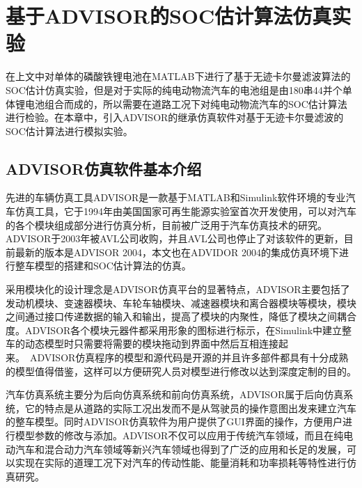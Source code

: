 
\chapter{基于ADVISOR的SOC估计算法仿真实验}
在上文中对单体的磷酸铁锂电池在MATLAB下进行了基于无迹卡尔曼滤波算法的SOC估计仿真实验，但是对于实际的纯电动物流汽车的电池组是由180串44并个单体锂电池组合而成的，所以需要在道路工况下对纯电动物流汽车的SOC估计算法进行检验。在本章中，引入ADVISOR的继承仿真软件对基于无迹卡尔曼滤波的SOC估计算法进行模拟实验。
\section{ADVISOR仿真软件基本介绍}
先进的车辆仿真工具ADVISOR是一款基于MATLAB和Simulink软件环境的专业汽车仿真工具，它于1994年由美国国家可再生能源实验室首次开发使用，可以对汽车的各个模块组成部分进行仿真分析，目前被广泛用于汽车仿真技术的研究。ADVISOR于2003年被AVL公司收购，并且AVL公司也停止了对该软件的更新，目前最新的版本是ADVISOR 2004，本文也在ADVIDOR 2004的集成仿真环境下进行整车模型的搭建和SOC估计算法的仿真。

采用模块化的设计理念是ADVISOR仿真平台的显著特点，ADVISOR主要包括了发动机模块、变速器模块、车轮车轴模块、减速器模块和离合器模块等模块，模块之间通过接口传递数据的输入和输出，提高了模块的内聚性，降低了模块之间耦合度。ADVISOR各个模块元器件都采用形象的图标进行标示，在Simulink中建立整车的动态模型时只需要将需要的模块拖动到界面中然后互相连接起来。\ ADVISOR仿真程序的模型和源代码是开源的并且许多部件都具有十分成熟的模型值得借鉴，这样可以方便研究人员对模型进行修改以达到深度定制的目的。

汽车仿真系统主要分为后向仿真系统和前向仿真系统，ADVISOR属于后向仿真系统，它的特点是从道路的实际工况出发而不是从驾驶员的操作意图出发来建立汽车的整车模型。同时ADVISOR仿真软件为用户提供了GUI界面的操作，方便用户进行模型参数的修改与添加。ADVISOR不仅可以应用于传统汽车领域，而且在纯电动汽车和混合动力汽车领域等新兴汽车领域也得到了广泛的应用和长足的发展，可以实现在实际的道理工况下对汽车的传动性能、能量消耗和功率损耗等特性进行仿真研究。
